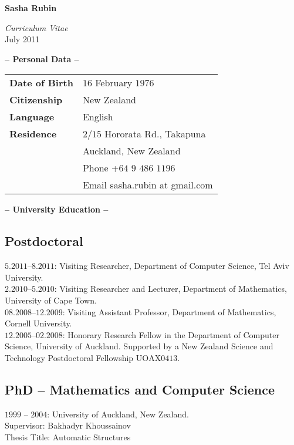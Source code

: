 \documentclass[a4paper]{article}
\def\tit#1{\medskip \begin{center}  {\Large {\bf -- #1 -- }} \end{center}}
\begin{document}
\begin{center}
{\Huge \bf Sasha Rubin}
\end{center}

\begin{center}
{\huge \it Curriculum Vitae} \\
\vspace{1em}
{\large July 2011}
\end {center}


\tit{Personal Data}
\begin{tabular}{@{}ll}

  \bf Date of Birth 
		 & $16$ February $1976$\\
  \bf Citizenship & New Zealand \\
  \bf Language   & English\\
  \bf Residence & $2/15$ Hororata Rd., Takapuna \\
  		 & Auckland, New Zealand\\
  \bf & Phone 	  +$64$ $9$ $486$ $1196$\\
   & Email   sasha.rubin at gmail.com
\end{tabular}

\tit{University Education}

\subsection*{Postdoctoral}

{$5.2011$--$8.2011$: Visiting Researcher, Department of Computer Science, Tel Aviv University.}\\

{$2.2010$--$5.2010$: Visiting Researcher and Lecturer, Department of Mathematics, University of Cape Town.}\\

{$08.2008$--$12.2009$: Visiting Assistant Professor, Department of Mathematics, Cornell University.} \\

{$12.2005$--$02.2008$: Honorary Research Fellow in the Department of Computer
Science, University of Auckland. Supported by a New Zealand Science and Technology Postdoctoral
Fellowship $\textrm{UOAX}0413$.}

\subsection*{{PhD -- Mathematics and Computer Science}}
{$1999$ -- $2004$: University of Auckland, New Zealand.\\
Supervisor: Bakhadyr Khoussainov\\
Thesis Title: Automatic Structures}
\end{document}
